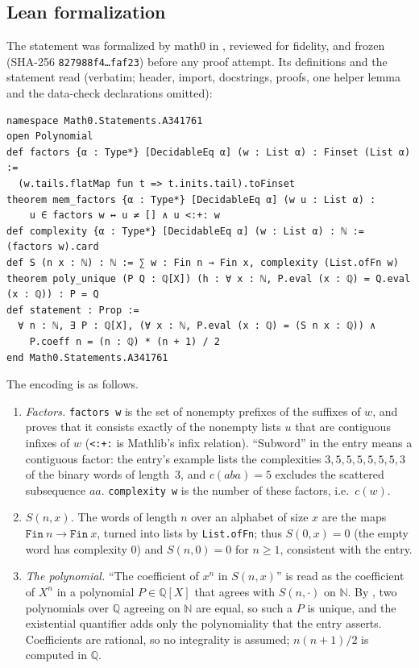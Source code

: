 \documentclass[11pt]{amsart}
\theoremstyle{plain}
\theoremstyle{definition}
\newcommand{\N}{\mathbb{N}}
\newcommand{\Q}{\mathbb{Q}}
\begin{document}
\subsection*{Lean formalization}
The statement was formalized by math0 in , reviewed for fidelity, and frozen (SHA-256 \texttt{827988f4\ldots faf23}) before any proof attempt. Its definitions and the statement read (verbatim; header, import, docstrings, proofs, one helper lemma and the data-check declarations omitted):
\begin{lstlisting}
namespace Math0.Statements.A341761
open Polynomial
def factors {α : Type*} [DecidableEq α] (w : List α) : Finset (List α) :=
  (w.tails.flatMap fun t => t.inits.tail).toFinset
theorem mem_factors {α : Type*} [DecidableEq α] (w u : List α) :
    u ∈ factors w ↔ u ≠ [] ∧ u <:+: w
def complexity {α : Type*} [DecidableEq α] (w : List α) : ℕ := (factors w).card
def S (n x : ℕ) : ℕ := ∑ w : Fin n → Fin x, complexity (List.ofFn w)
theorem poly_unique (P Q : ℚ[X]) (h : ∀ x : ℕ, P.eval (x : ℚ) = Q.eval (x : ℚ)) : P = Q
def statement : Prop :=
  ∀ n : ℕ, ∃ P : ℚ[X], (∀ x : ℕ, P.eval (x : ℚ) = (S n x : ℚ)) ∧
    P.coeff n = (n : ℚ) * (n + 1) / 2
end Math0.Statements.A341761
\end{lstlisting}
The encoding is as follows.
\begin{enumerate}
\item \emph{Factors.} \texttt{factors w} is the set of nonempty prefixes of the suffixes of $w$, and  proves that it consists exactly of the nonempty lists $u$ that are contiguous infixes of $w$ (\texttt{<:+:} is Mathlib's infix relation). ``Subword'' in the entry means a contiguous factor: the entry's example lists the complexities $3,5,5,5,5,5,5,3$ of the binary words of length~$3$, and $c(aba)=5$ excludes the scattered subsequence $aa$. \texttt{complexity w} is the number of these factors, i.e.\ $c(w)$.
\item \emph{$S(n,x)$.} The words of length $n$ over an alphabet of size $x$ are the maps $\mathtt{Fin}\ n\to\mathtt{Fin}\ x$, turned into lists by \texttt{List.ofFn}; thus $S(0,x)=0$ (the empty word has complexity $0$) and $S(n,0)=0$ for $n\ge1$, consistent with the entry.
\item \emph{The polynomial.} ``The coefficient of $x^n$ in $S(n,x)$'' is read as the coefficient of $X^n$ in a polynomial $P\in\Q[X]$ that agrees with $S(n,\cdot)$ on $\N$. By , two polynomials over $\Q$ agreeing on $\N$ are equal, so such a $P$ is unique, and the existential quantifier adds only the polynomiality that the entry asserts. Coefficients are rational, so no integrality is assumed; $n(n+1)/2$ is computed in $\Q$.
\end{enumerate}
\end{document}

